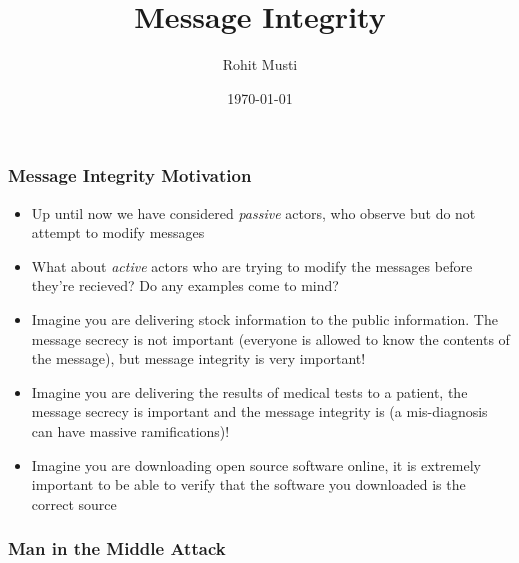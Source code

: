\documentclass[handout]{beamer}
\title{Message Integrity}
\author{Rohit Musti}
\institute{CUNY - Hunter College}
\date{\today}
\begin{document}
 
\frame{\titlepage}

\begin{frame}
    \frametitle{Message Integrity Motivation}
    \begin{itemize}
      \item \pause Up until now we have considered \textit{passive} actors, who observe but do not attempt to modify messages \pause
      \item What about \textit{active} actors who are trying to modify the messages before they're recieved? Do any examples come to mind? \pause
      \item Imagine you are delivering stock information to the public information. The message secrecy is not important (everyone is allowed to know the contents of the message), but message integrity is very important! \pause
      \item Imagine you are delivering the results of medical tests to a patient, the message secrecy is important and the message integrity is (a mis-diagnosis can have massive ramifications)! \pause
      \item Imagine you are downloading open source software online, it is extremely important to be able to verify that the software you downloaded is the correct source

    \end{itemize}

\end{frame}


\begin{frame}
    \frametitle{Man in the Middle Attack}
    \pause {}\\ \pause
    \bigskip
\end{frame}
\end{document}
